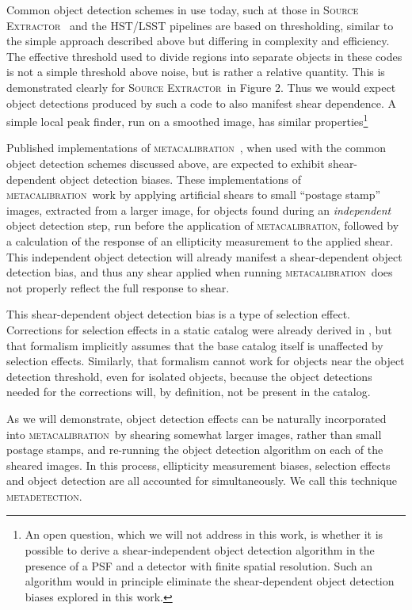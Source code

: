 \documentclass[iop, appendixfloats, numberedappendix, apj]{emulateapj}
\newcommand{\mcal}{\textsc{metacalibration}}
\newcommand{\mdet}{\textsc{metadetection}}
\newcommand{\sx}{\textsc{Source Extractor}}
\begin{document}
Common object detection schemes in use today, such at those in \sx\
\citep{Bertin96} and the HST/LSST pipelines \citep{BoschHSC2018,BoschLSST2018}
are based on thresholding, similar to the simple approach described above but
differing in complexity and efficiency. The effective threshold used to divide
regions into separate objects in these codes is not a simple threshold above
noise, but is rather a relative quantity.  This is demonstrated clearly for
\sx\ in \cite{Bertin96} Figure 2.  Thus we would expect object detections
produced by such a code to also manifest shear dependence. A simple local peak
finder, run on a smoothed image, has similar properties\footnote{An open question,
which we will not address in this work, is whether it is possible to derive a
shear-independent object detection algorithm  in the presence of a PSF and a
detector with finite spatial resolution.  Such an algorithm would in principle
eliminate the shear-dependent object detection biases explored in this work.}

Published implementations of \mcal\
\citep[e.g.,][]{HuffMcal2017,SheldonMcal2017}, when used with the common object
detection schemes discussed above, are expected to exhibit shear-dependent
object detection biases. These implementations of \mcal\ work by applying
artificial shears to small ``postage stamp'' images, extracted from a larger
image, for objects found during an {\em independent} object detection step, run
before the application of \mcal, followed by a calculation of the response of
an ellipticity measurement to the applied shear. This independent object
detection will already manifest a shear-dependent object detection bias, and
thus any shear applied when running \mcal\ does not properly reflect the full
response to shear.

This shear-dependent object detection bias is a type of selection effect.
Corrections for selection effects in a static catalog were already derived in
\cite{SheldonMcal2017}, but that formalism implicitly assumes that the base
catalog itself is unaffected by selection effects.  Similarly, that formalism
cannot work for objects near the object detection threshold, even for isolated
objects, because the object detections needed for the corrections will, by
definition, not be present in the catalog.

As we will demonstrate, object detection effects can be naturally incorporated
into \mcal\ by shearing somewhat larger images, rather than small postage
stamps, and re-running the object detection algorithm on each of the sheared
images. In this process, ellipticity measurement biases, selection effects and
object detection are all accounted for simultaneously. We call this technique
\mdet.
\end{document}
